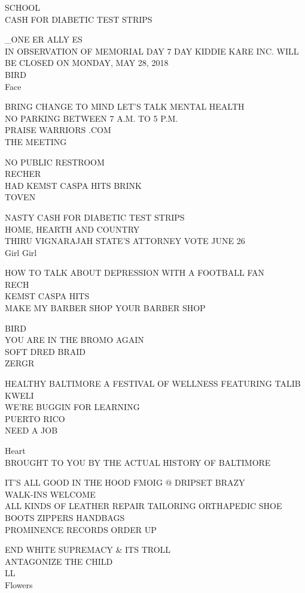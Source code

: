 \documentclass[10pt,letterpaper]{article}
\begin{document}
SCHOOL\\
CASH FOR DIABETIC TEST STRIPS

\_ONE ER ALLY ES\\
IN OBSERVATION OF MEMORIAL DAY 7 DAY KIDDIE KARE INC. WILL BE CLOSED ON MONDAY, MAY 28, 2018\\
BIRD\\
Face

BRING CHANGE TO MIND LET'S TALK MENTAL HEALTH\\
NO PARKING BETWEEN 7 A.M. TO 5 P.M.\\
PRAISE WARRIORS .COM\\
THE MEETING

NO PUBLIC RESTROOM\\
RECHER\\
HAD KEMST CASPA HITS BRINK\\
TOVEN

NASTY CASH FOR DIABETIC TEST STRIPS\\
HOME, HEARTH AND COUNTRY\\
THIRU VIGNARAJAH STATE'S ATTORNEY VOTE JUNE 26\\
Girl Girl

HOW TO TALK ABOUT DEPRESSION WITH A FOOTBALL FAN\\
RECH\\
KEMST CASPA HITS\\
MAKE MY BARBER SHOP YOUR BARBER SHOP

BIRD\\
YOU ARE IN THE BROMO AGAIN\\
SOFT DRED BRAID\\
ZERGR

HEALTHY BALTIMORE A FESTIVAL OF WELLNESS FEATURING TALIB KWELI\\
WE'RE BUGGIN FOR LEARNING\\
PUERTO RICO\\
NEED A JOB

Heart\\
BROUGHT TO YOU BY THE ACTUAL HISTORY OF BALTIMORE

IT'S ALL GOOD IN THE HOOD FMOIG @ DRIPSET BRAZY\\
WALK{-}INS WELCOME\\
ALL KINDS OF LEATHER REPAIR TAILORING ORTHAPEDIC  SHOE BOOTS ZIPPERS HANDBAGS\\
PROMINENCE RECORDS ORDER UP

END WHITE SUPREMACY \& ITS TROLL\\
ANTAGONIZE THE CHILD\\
LL\\
Flowers
\end{document}
